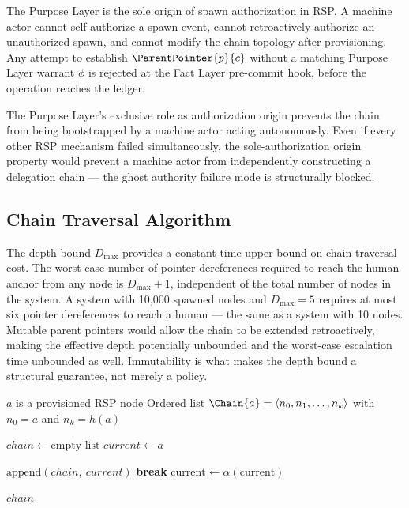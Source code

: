 \documentclass[12pt]{article}
\begin{document}
\begin{prop}
\label{prop:exclusive-auth-origin}
The Purpose Layer is the sole origin of spawn authorization in RSP. A machine actor cannot self-authorize a spawn event, cannot retroactively authorize an unauthorized spawn, and cannot modify the chain topology after provisioning. Any attempt to establish $\ParentPointer{p}{c}$ without a matching Purpose Layer warrant $\phi$ is rejected at the Fact Layer pre-commit hook, before the operation reaches the ledger.

The Purpose Layer's exclusive role as authorization origin prevents the chain from being bootstrapped by a machine actor acting autonomously. Even if every other RSP mechanism failed simultaneously, the sole-authorization origin property would prevent a machine actor from independently constructing a delegation chain — the ghost authority failure mode is structurally blocked.
\end{prop}

\subsection{Chain Traversal Algorithm}
\label{sec:chain-traversal}

The depth bound $D_{\max}$ provides a constant-time upper bound on chain traversal cost. The worst-case number of pointer dereferences required to reach the human anchor from any node is $D_{\max} + 1$, independent of the total number of nodes in the system. A system with 10,000 spawned nodes and $D_{\max} = 5$ requires at most six pointer dereferences to reach a human — the same as a system with 10 nodes. Mutable parent pointers would allow the chain to be extended retroactively, making the effective depth potentially unbounded and the worst-case escalation time unbounded as well. Immutability is what makes the depth bound a structural guarantee, not merely a policy.

\begin{algorithm}
\caption{Chain-Traverse($a$) — Retrieve the delegation chain from node $a$ to human anchor}
\label{alg:chain-traverse}
\begin{algorithmic}[1]
\REQUIRE $a$ is a provisioned RSP node
\ENSURE Ordered list $\Chain{a} = \langle n_0, n_1, \ldots, n_k \rangle$ with $n_0 = a$ and $n_k = h(a)$

\STATE $chain \leftarrow \text{empty list}$
\STATE $current \leftarrow a$ 

    \STATE $\text{append}(chain,\ current)$ 
        \STATE \textbf{break} 
    \ENDIF
    \STATE $\text{current} \leftarrow \alpha(\text{current})$ 
\ENDWHILE

\RETURN $chain$
\end{algorithmic}
\end{algorithm}
\end{document}
